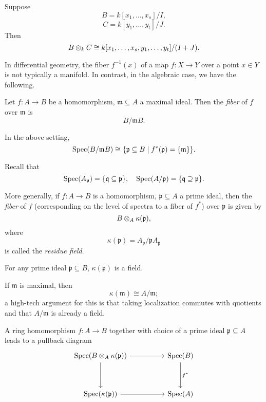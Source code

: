 \begin{corollary}
  Suppose
  \[ B = k[x_1, \dotsc, x_s] / {I},\]
  \[ C = k[y_1, \dotsc, y_t] /{J}.\]
  Then
  \[ B \otimes_k C \cong k[x_1, \dotsc, x_s, y_1, \dotsc, y_t] / {(I + J)}.\]
\end{corollary}

In differential geometry, the fiber \(f^{-1}(x)\) of a map $f \colon X \to Y$ over a point \(x \in Y\) is not typically a manifold. In contrast, in the algebraic case, we have the following.

\begin{df}
  Let $f \colon A \to B$ be a homomorphism, $\mathfrak m \subseteq A$ a maximal ideal. Then the \textit{fiber} of $f$ over $\mathfrak m$ is
  \[ B /{\mathfrak m B}.\]
\end{df}

\begin{prop}
  In the above setting,
  \[\text{Spec}(B /{\mathfrak m B}) \cong \{ \mathfrak p \subseteq B \mathrel{|} f^*(\mathfrak p) = \{ \mathfrak m \} \}.\]
\end{prop}

Recall that
\[ \text{Spec}(A_{\mathfrak p}) = \{ \mathfrak q \subseteq \mathfrak p\}, \quad
\text{Spec}(A /{\mathfrak p}) = \{ \mathfrak q \supseteq \mathfrak p\}.\]

\begin{df}
  More generally, if $f \colon A \to B$ is a homomorphism, $\mathfrak p \subseteq A$ a prime ideal, then the \textit{fiber} of $f$ (corresponding on the level of spectra to a fiber of \(f^*\)) over $\mathfrak p$ is given by
  \[ B \otimes_A \kappa(\mathfrak p),\]
  where
  \[ \kappa(\mathfrak p) = A_{\mathfrak p} / {\mathfrak p A_{\mathfrak p}}\]
  is called the \textit{residue field}.
\end{df}

\begin{prop}
  For any prime ideal $\mathfrak p \subseteq B$, $\kappa(\mathfrak p)$ is a field.
\end{prop}

\begin{note}
  If $\mathfrak m$ is maximal, then
  \[ \kappa(\mathfrak m) \cong A / {\mathfrak m};\]
  a high-tech argument for this is that taking localization commutes with quotients and that \(A/{\mathfrak{m}}\) is already a field.
\end{note}

\begin{prop}
  A ring homomorphism \(f \colon A \to B\) together with choice of a prime ideal \(\mathfrak{p} \subseteq A\) leads to a pullback diagram
  \begin{equation*}
    \begin{tikzcd}[column sep = huge, row sep = huge]
      \spec(B \tensor_A \kappa(\mathfrak p)) \arrow{r} \arrow{d}
      & \spec(B) \arrow{d}{f^*} \\
      \spec(\kappa(\mathfrak p)) \arrow{r}
      & \spec(A)
    \end{tikzcd}
  \end{equation*}
\end{prop}




